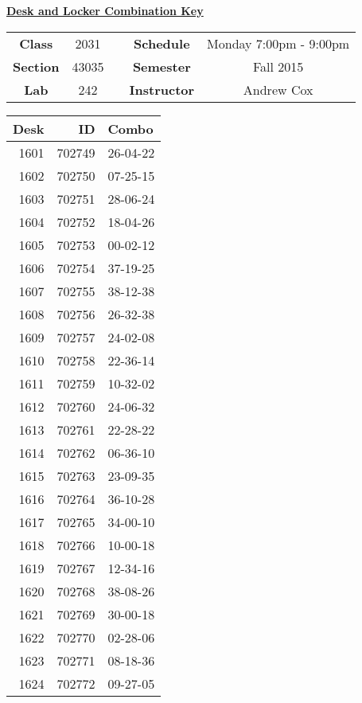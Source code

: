 \documentclass[12pt]{article}
\begin{document}
\thispagestyle{empty}

\begin{center}
	{\huge\textbf{\underline{ Desk and Locker Combination Key}}}
\end{center}


\begin{table}[h]
  \centering
  \begin{tabular}{ccccc}

  \textbf{Class} & 2031 & {\qquad} &\textbf{Schedule} & Monday 7:00pm - 9:00pm \\
  \textbf{Section} & 43035 & {\qquad} & \textbf{Semester} & Fall 2015 \\
  \textbf{Lab} & 242 & {\qquad} & \textbf{Instructor} & Andrew Cox \\
  \end{tabular}
\end{table}
 \vspace{0.1in}
\begin{minipage}{0.4\textwidth}

\begin{tabular}{rrl}
\toprule
 Desk &      ID &     Combo \\
\midrule
 1601 &  702749 &  26-04-22 \\
 1602 &  702750 &  07-25-15 \\
 1603 &  702751 &  28-06-24 \\
 1604 &  702752 &  18-04-26 \\
 1605 &  702753 &  00-02-12 \\
 1606 &  702754 &  37-19-25 \\
 1607 &  702755 &  38-12-38 \\
 1608 &  702756 &  26-32-38 \\
 1609 &  702757 &  24-02-08 \\
 1610 &  702758 &  22-36-14 \\
 1611 &  702759 &  10-32-02 \\
 1612 &  702760 &  24-06-32 \\
 1613 &  702761 &  22-28-22 \\
 1614 &  702762 &  06-36-10 \\
 1615 &  702763 &  23-09-35 \\
 1616 &  702764 &  36-10-28 \\
 1617 &  702765 &  34-00-10 \\
 1618 &  702766 &  10-00-18 \\
 1619 &  702767 &  12-34-16 \\
 1620 &  702768 &  38-08-26 \\
 1621 &  702769 &  30-00-18 \\
 1622 &  702770 &  02-28-06 \\
 1623 &  702771 &  08-18-36 \\
 1624 &  702772 &  09-27-05 \\
\bottomrule
\end{tabular}


\end{minipage}
\end{document}
